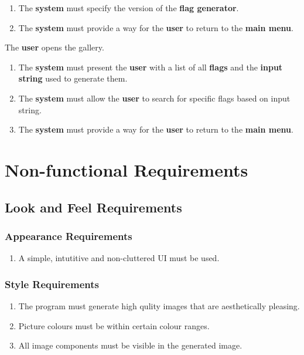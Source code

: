 \documentclass[12pt, titlepage]{article}
\begin{document}
\begin{enumerate}[label=BE\arabic*.]
\begin{item}
\begin{enumerate}[label=FR\arabic*., resume*=frs]
            \item The \textbf{system} must specify the version of the \textbf{flag generator}.

            \item The \textbf{system} must provide a way for the \textbf{user} to return to the \textbf{main menu}.
        \end{enumerate}
    \end{item}

    \begin{item}
        The \textbf{user} opens the gallery.
        \begin{enumerate}[label=FR\arabic*., resume*=frs]
            \item The \textbf{system} must present the \textbf{user} with a list of all \textbf{flags} and the \textbf{input string} used to generate them.

            \item The \textbf{system} must allow the \textbf{user} to search for specific flags based on input string.

            \item The \textbf{system} must provide a way for the \textbf{user} to return to the \textbf{main menu}.
        \end{enumerate}
    \end{item}
\end{enumerate}

\section{Non-functional Requirements}

\subsection{Look and Feel Requirements}

\subsubsection{Appearance Requirements}
\begin{enumerate}[label=LF\arabic*., series=lfs]
    \item A simple, intutitive and non-cluttered UI must be used.
\end{enumerate}

\subsubsection{Style Requirements} 
\begin{enumerate}[label=LF\arabic*., resume=lfs]
    \item The program must generate high qulity images that are aesthetically pleasing.
    \item Picture colours must be within certain colour ranges.
    \item All image components must be visible in the generated image.
\end{enumerate}
\end{document}
